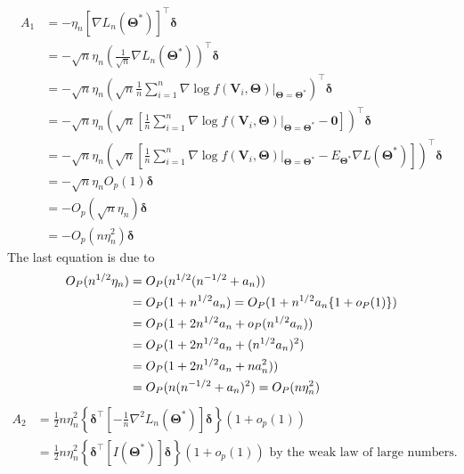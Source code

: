\documentclass[12pt,letter]{article}\usepackage[]{graphicx}\usepackage[]{color}
\begin{document}
\[
\begin{aligned}A_{1} & =-\eta_{n}\left[\nabla L_{n}\left(\boldsymbol{\Theta}^{*}\right)\right]^{\top}\boldsymbol{\delta}\\
& =-\sqrt{n}\eta_{n}\left(\frac{1}{\sqrt{n}}\nabla L_{n}\left(\boldsymbol{\Theta}^{*}\right)\right)^{\top}\boldsymbol{\delta}\\
& =-\sqrt{n}\eta_{n}\left(\sqrt{n}\frac{1}{n}\sum_{i=1}^{n}\nabla\log f\left.\left(\boldsymbol{V}_{i},\boldsymbol{\Theta}\right)\right|_{\boldsymbol{\Theta}=\boldsymbol{\Theta}^{*}}\right)^{\top}\boldsymbol{\delta}\\
& =-\sqrt{n}\eta_{n}\left(\sqrt{n}\left[\frac{1}{n}\sum_{i=1}^{n}\nabla\log f\left.\left(\boldsymbol{V}_{i},\boldsymbol{\Theta}\right)\right|_{\boldsymbol{\Theta}=\boldsymbol{\Theta}^{*}}-\mathbf{0}\right]\right)^{\top}\boldsymbol{\delta}\\
& =-\sqrt{n}\eta_{n}\left(\sqrt{n}\left[\frac{1}{n}\sum_{i=1}^{n}\nabla\log f\left.\left(\boldsymbol{V}_{i},\boldsymbol{\Theta}\right)\right|_{\boldsymbol{\Theta}=\boldsymbol{\Theta}^{*}}-E_{\boldsymbol{\Theta}^{*}}\nabla L\left(\boldsymbol{\Theta}^{*}\right)\right]\right)^{\top}\boldsymbol{\delta}\\
& =-\sqrt{n}\eta_{n}O_{p}\left(1\right)\boldsymbol{\delta}\\
& =-O_{p}\left(\sqrt{n}\eta_{n}\right)\boldsymbol{\delta}\\
& =-O_{p}\left(n\eta_{n}^{2}\right)\boldsymbol{\delta}
\end{aligned}
\]
The last equation is due to
\begin{align*}
O_{P}(n^{1/2}\eta_{n}) & =O_{P}(n^{1/2}(n^{-1/2}+a_{n}))\\
& =O_{P}(1+n^{1/2}a_{n})=O_{P}(1+n^{1/2}a_{n}\{1+o_{P}(1)\})\\
& =O_{P}(1+2n^{1/2}a_{n}+o_{P}(n^{1/2}a_{n}))\\
& =O_{P}(1+2n^{1/2}a_{n}+(n^{1/2}a_{n})^{2})\\
& =O_{P}(1+2n^{1/2}a_{n}+na_{n}^{2}))\\
& =O_{P}(n(n^{-1/2}+a_{n})^{2})=O_{P}(n\eta_{n}^{2})
\end{align*}
\[
\begin{aligned}A_{2} & =\frac{1}{2}n\eta_{n}^{2}\left\{ \boldsymbol{\delta}^{\top}\left[-\frac{1}{n}\nabla^{2}L_{n}\left(\boldsymbol{\Theta}^{*}\right)\right]\boldsymbol{\delta}\right\} \left(1+o_{p}(1)\right)\\
& =\frac{1}{2}n\eta_{n}^{2}\left\{ \boldsymbol{\delta}^{\top}\left[I\left(\boldsymbol{\Theta}^{*}\right)\right]\boldsymbol{\delta}\right\} \left(1+o_{p}(1)\right)\text{ by the weak law of large numbers. }
\end{aligned}
\]
\end{document}

